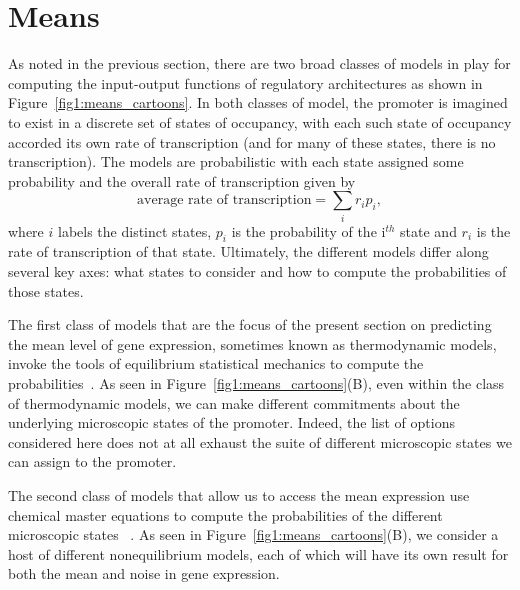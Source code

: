 \section{Means}

As noted in the previous section, there are two broad classes of models
in play for computing the input-output functions of regulatory architectures 
as shown in Figure~\ref{fig1:means_cartoons}.
In both classes of model, the promoter is imagined to exist in a discrete
set of states of occupancy, with each such state of occupancy
accorded its own rate of transcription (and for many of these
states, there is no transcription).  The models are probabilistic with
each state assigned some probability and the overall rate of transcription
given by 
\begin{equation}
\mbox{average rate of transcription} = \sum_i r_i p_i,
\end{equation}
where $i$ labels the distinct states, $p_i$ is the probability of
the i$^{th}$ state and $r_i$ is the rate of transcription of
that state.  Ultimately, the different models differ along several key
axes: what states to consider and how to compute the probabilities of those
states.

The first class of models that are the focus of
the present section on predicting the mean
level of gene expression, sometimes known as thermodynamic models,
invoke the tools of equilibrium statistical mechanics to compute the 
probabilities~\cite{Ackers1982, Shea1985, Buchler2003,Vilar2003a,Vilar2003b, Bintu2005a,Bintu2005c, Gertz2009,Sherman2012, Saiz2013}.
As seen in Figure~\ref{fig1:means_cartoons}(B), even within
the class of thermodynamic models, we can make different commitments
about the underlying microscopic states of the promoter.  Indeed,
the list of options considered here does not at all exhaust the suite
of different microscopic states we can assign to the promoter.

The second class of models that allow us to access the mean
expression use chemical master equations to compute the
probabilities of the different microscopic states
~\cite{Ko1991,Peccoud1995,Record1996,
Kepler2001, Sanchez2008,Shahrezaei2008,Sanchez2011, Michel2010}.
As seen in Figure~\ref{fig1:means_cartoons}(B), we consider a host of
different nonequilibrium models, each of which will have its own 
result for both the mean and noise in gene expression.


